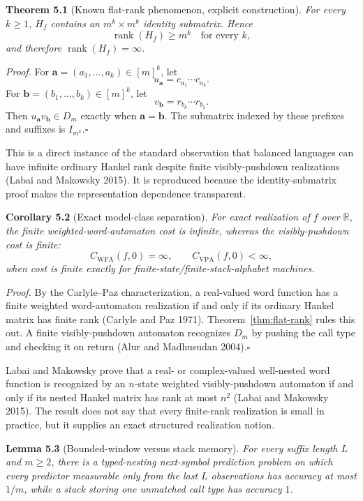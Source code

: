 \documentclass[11pt]{article}
\begin{document}
\label{thm:flat-rank}
\textbf{Theorem 5.1} (Known flat-rank phenomenon, explicit construction). \emph{For every \(k\geq1\), \(H_f\) contains an \(m^k\times m^k\) identity submatrix. Hence \[\operatorname{rank}(H_f)\geq m^k\quad\text{for every }k,\] and therefore \(\operatorname{rank}(H_f)=\infty\).}

\emph{Proof.} For \(\bm a=(a_1,\ldots,a_k)\in[m]^k\), let \[u_{\bm a}=c_{a_1}\cdots c_{a_k}.\] For \(\bm b=(b_1,\ldots,b_k)\in[m]^k\), let \[v_{\bm b}=r_{b_k}\cdots r_{b_1}.\] Then \(u_{\bm a}v_{\bm b}\in D_m\) exactly when \(\bm a=\bm b\). The submatrix indexed by these prefixes and suffixes is \(I_{m^k}\).\hfill\(\square\)

This is a direct instance of the standard observation that balanced languages can have infinite ordinary Hankel rank despite finite visibly-pushdown realizations (Labai and Makowsky 2015). It is reproduced because the identity-submatrix proof makes the representation dependence transparent.

\label{cor:model-class-separation}
\textbf{Corollary 5.2} (Exact model-class separation). \emph{For exact realization of \(f\) over \(\mathbb{R}\), the finite weighted-word-automaton cost is infinite, whereas the visibly-pushdown cost is finite: \[C_{\mathrm{WFA}}(f,0)=\infty,
\qquad
C_{\mathrm{VPA}}(f,0)<\infty,\] when cost is finite exactly for finite-state/finite-stack-alphabet machines.}

\emph{Proof.} By the Carlyle--Paz characterization, a real-valued word function has a finite weighted word-automaton realization if and only if its ordinary Hankel matrix has finite rank (Carlyle and Paz 1971). Theorem~\ref{thm:flat-rank} rules this out. A finite visibly-pushdown automaton recognizes \(D_m\) by pushing the call type and checking it on return (Alur and Madhusudan 2004).\hfill\(\square\)

Labai and Makowsky prove that a real- or complex-valued well-nested word function is recognized by an \(n\)-state weighted visibly-pushdown automaton if and only if its nested Hankel matrix has rank at most \(n^2\) (Labai and Makowsky 2015). The result does not say that every finite-rank realization is small in practice, but it supplies an exact structured realization notion.

\label{lem:window}
\textbf{Lemma 5.3} (Bounded-window versus stack memory). \emph{For every suffix length \(L\) and \(m\geq2\), there is a typed-nesting next-symbol prediction problem on which every predictor measurable only from the last \(L\) observations has accuracy at most \(1/m\), while a stack storing one unmatched call type has accuracy \(1\).}
\end{document}
